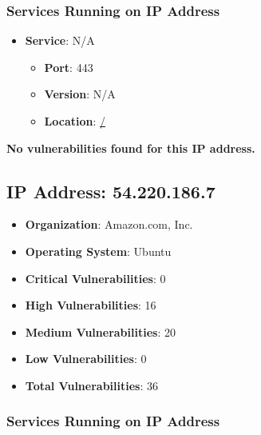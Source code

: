 \documentclass{article}
\begin{document}
\subsubsection*{Services Running on IP Address}

\begin{itemize}
    
        \item \textbf{Service}: N/A
        \begin{itemize}
            \item \textbf{Port}: 443
            \item \textbf{Version}:  N/A 
            \item \textbf{Location}: \href{ / }{ / }
        \end{itemize}
    
\end{itemize}


\textbf{No vulnerabilities found for this IP address.}




\clearpage



\subsection*{IP Address: 54.220.186.7}

\begin{itemize}
    \item \textbf{Organization}: Amazon.com, Inc.
    \item \textbf{Operating System}:  Ubuntu 
    \item \textbf{Critical Vulnerabilities}: 0
    \item \textbf{High Vulnerabilities}: 16
    \item \textbf{Medium Vulnerabilities}: 20
    \item \textbf{Low Vulnerabilities}: 0
    \item \textbf{Total Vulnerabilities}: 36
\end{itemize}

\subsubsection*{Services Running on IP Address}
\end{document}
